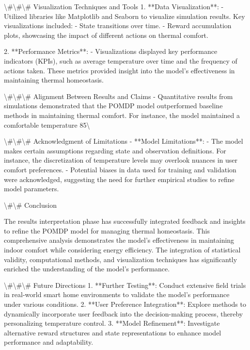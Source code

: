 \documentclass[11pt,a4paper]{article}
\begin{document}
\textbackslash{}#\textbackslash{}#\textbackslash{}# Visualization Techniques and Tools
1. **Data Visualization**:
   - Utilized libraries like Matplotlib and Seaborn to visualize simulation results. Key visualizations included:
     - State transitions over time.
     - Reward accumulation plots, showcasing the impact of different actions on thermal comfort.

2. **Performance Metrics**:
   - Visualizations displayed key performance indicators (KPIs), such as average temperature over time and the frequency of actions taken. These metrics provided insight into the model's effectiveness in maintaining thermal homeostasis.

\textbackslash{}#\textbackslash{}#\textbackslash{}# Alignment Between Results and Claims
- Quantitative results from simulations demonstrated that the POMDP model outperformed baseline methods in maintaining thermal comfort. For instance, the model maintained a comfortable temperature 85\textbackslash{}%

\textbackslash{}#\textbackslash{}#\textbackslash{}# Acknowledgment of Limitations
- **Model Limitations**: 
  - The model makes certain assumptions regarding state and observation definitions. For instance, the discretization of temperature levels may overlook nuances in user comfort preferences.
  - Potential biases in data used for training and validation were acknowledged, suggesting the need for further empirical studies to refine model parameters.

\textbackslash{}#\textbackslash{}# Conclusion

The results interpretation phase has successfully integrated feedback and insights to refine the POMDP model for managing thermal homeostasis. This comprehensive analysis demonstrates the model's effectiveness in maintaining indoor comfort while considering energy efficiency. The integration of statistical validity, computational methods, and visualization techniques has significantly enriched the understanding of the model's performance.

\textbackslash{}#\textbackslash{}#\textbackslash{}# Future Directions
1. **Further Testing**: Conduct extensive field trials in real-world smart home environments to validate the model's performance under various conditions.
2. **User Preference Integration**: Explore methods to dynamically incorporate user feedback into the decision-making process, thereby personalizing temperature control.
3. **Model Refinement**: Investigate alternative reward structures and state representations to enhance model performance and adaptability.
\end{document}

